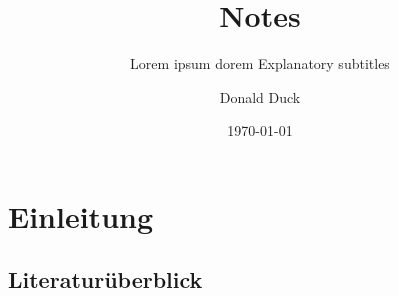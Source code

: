 \documentclass[german]{dlrib}
\title[dasdas]{Notes}
\subtitle{Lorem ipsum dorem Explanatory subtitles}
\author{Donald Duck}
\date{\today}
\begin{document}
\maketitle

\tableofcontents

\listoffigures

\listoftables

\chapter{Einleitung}

\section{Literaturüberblick}
\end{document}
